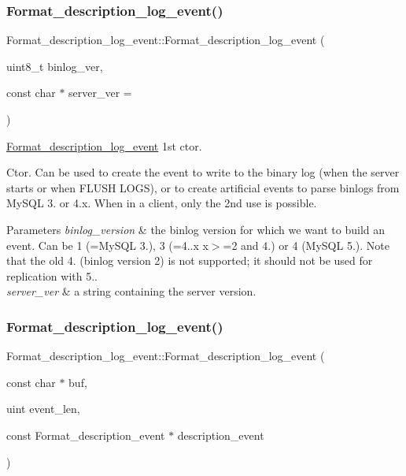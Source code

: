\subsubsection{\texorpdfstring{Format\+\_\+description\+\_\+log\+\_\+event()}{Format\_description\_log\_event()}\hspace{0.1cm}{\footnotesize\ttfamily [1/2]}}
{\footnotesize\ttfamily Format\+\_\+description\+\_\+log\+\_\+event\+::\+Format\+\_\+description\+\_\+log\+\_\+event (\begin{DoxyParamCaption}\item[{uint8\+\_\+t}]{binlog\+\_\+ver,  }\item[{const char $\ast$}]{server\+\_\+ver = {} }\end{DoxyParamCaption})}

\mbox{\hyperlink{classFormat__description__log__event}{Format\+\_\+description\+\_\+log\+\_\+event}} 1st ctor.

Ctor. Can be used to create the event to write to the binary log (when the server starts or when F\+L\+U\+SH L\+O\+GS), or to create artificial events to parse binlogs from My\+S\+QL 3. or 4.\+x. When in a client, only the 2nd use is possible.


\begin{DoxyParams}{Parameters}
{\em binlog\+\_\+version} & the binlog version for which we want to build an event. Can be 1 (=My\+S\+QL 3.), 3 (=4..\+x x$>$=2 and 4.) or 4 (My\+S\+QL 5.). Note that the old 4. (binlog version 2) is not supported; it should not be used for replication with 5.. \\
\hline
{\em server\+\_\+ver} & a string containing the server version. \\
\hline
\end{DoxyParams}
\mbox{\label{classFormat__description__log__event_a0f616fc36bc7f1f9574195799b1a9db7}} 
\subsubsection{\texorpdfstring{Format\+\_\+description\+\_\+log\+\_\+event()}{Format\_description\_log\_event()}\hspace{0.1cm}{\footnotesize\ttfamily [2/2]}}
{\footnotesize\ttfamily Format\+\_\+description\+\_\+log\+\_\+event\+::\+Format\+\_\+description\+\_\+log\+\_\+event (\begin{DoxyParamCaption}\item[{const char $\ast$}]{buf,  }\item[{uint}]{event\+\_\+len,  }\item[{const Format\+\_\+description\+\_\+event $\ast$}]{description\+\_\+event }\end{DoxyParamCaption})}

